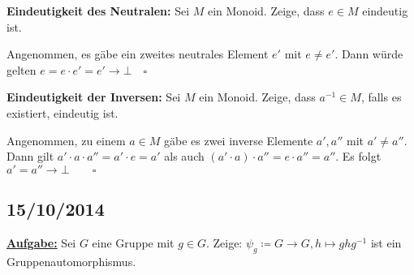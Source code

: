 \documentclass[10pt,a4paper]{article}
\begin{document}
\textbf{Eindeutigkeit des Neutralen:} Sei $M$ ein Monoid. Zeige, dass $e \in M$ eindeutig ist.\bigskip

Angenommen, es gäbe ein zweites neutrales Element $e'$ mit $e \neq e'$. Dann würde gelten $e = e \cdot e' = e' \rightarrow \bot \quad \square$\bigskip

\textbf{Eindeutigkeit der Inversen:} Sei $M$ ein Monoid. Zeige, dass $a^{-1} \in M$, falls es existiert, eindeutig ist.\bigskip

Angenommen, zu einem $a \in M$ gäbe es zwei inverse Elemente $a', a''$ mit $a' \neq a''$. Dann gilt $a' \cdot a \cdot a''= a' \cdot e = a'$ als auch $(a' \cdot a) \cdot a'' = e \cdot a'' = a''$. Es folgt $a' = a'' \rightarrow \bot \qquad \square$

\subsection{15/10/2014}

\textbf{\underline{Aufgabe:}} Sei $G$ eine Gruppe mit $g \in G$. Zeige: $\psi_g \coloneqq G \to G, h \mapsto g h g^{-1}$ ist ein Gruppenautomorphismus.
\end{document}
